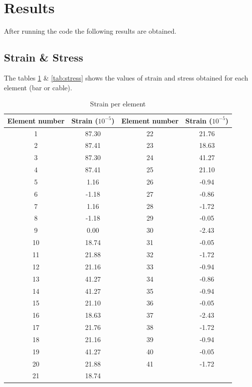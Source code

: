 \newpage
\section{Results}

After running the code the following results are obtained.\\

\subsection{Strain \& Stress}

The tables \ref{tab:strain} \& \ref{tab:stress} shows the values of strain and stress obtained for each element
(bar or cable).

\begin{table}[h]
\centering
\begin{tabular}{|c|c|c|c|}
\hline
\textbf{Element number} & \textbf{Strain} ($10^{-5}$) & \textbf{Element number} & \textbf{Strain} ($10^{-5}$) \\ \hline
1 &   87.30 &  22 &  21.76 \\ \hline
2 &   87.41 &  23 &  18.63 \\ \hline
3 &   87.30 &  24 &  41.27 \\ \hline
4 &   87.41 &  25 &  21.10 \\ \hline
5 &    1.16 &  26 &  -0.94 \\ \hline
6 &   -1.18 &  27 &  -0.86 \\ \hline
7 &    1.16 &  28 &  -1.72 \\ \hline
8 &   -1.18 &  29 &  -0.05 \\ \hline
9 &    0.00 &  30 &  -2.43 \\ \hline
10 &   18.74 &  31 &  -0.05 \\ \hline
11 &   21.88 &  32 &  -1.72 \\ \hline
12 &   21.16 &  33 &  -0.94 \\ \hline
13 &   41.27 &  34 &  -0.86 \\ \hline
14 &   41.27 &  35 &  -0.94 \\ \hline
15 &   21.10 &  36 &  -0.05 \\ \hline
16 &   18.63 &  37 &  -2.43 \\ \hline
17 &   21.76 &  38 &  -1.72 \\ \hline
18 &   21.16 &  39 &  -0.94 \\ \hline
19 &   41.27 &  40 &  -0.05 \\ \hline
20 &   21.88 &  41 &  -1.72 \\ \hline
21 &   18.74 &   &   \\ \hline
\end{tabular}
\caption{Strain per element}
\label{tab:strain}
\end{table}

